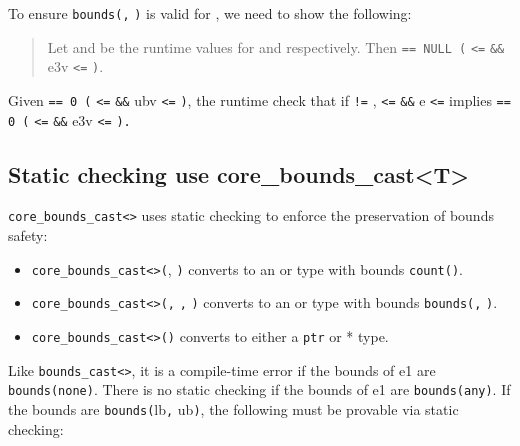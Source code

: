 To ensure \texttt{bounds(}\texttt{,} \texttt{)} is
valid for , we need to show the following:

\begin{quote}
Let  and  be the runtime values for  and
 respectively. Then  \texttt{== NULL
\textbar{}\textbar{} (} \texttt{\textless{}=} 
\texttt{\&\&} e3v \texttt{\textless{}=} \texttt{)}.
\end{quote}

Given  \texttt{== 0 \textbar{}\textbar{} (}
\texttt{\textless{}=}  \texttt{\&\&} ubv \texttt{\textless{}=}
\texttt{)}, the runtime check that if  \texttt{!=}
,  \texttt{\textless{}=}  \texttt{\&\&}
e \texttt{\textless{}=}  implies 
\texttt{== 0 \textbar{}\textbar{} (} \texttt{\textless{}=}
 \texttt{\&\&} e3v \texttt{\textless{}=}
\texttt{).}

\subsection{Static checking use core\_bounds\_cast\textless{}T\textgreater{}}
\label{static-checking-use-coreux5fboundsux5fcastt}

\texttt{core\_bounds\_cast\textless{}}\texttt{\textgreater{}}
uses static checking to enforce the preservation of bounds safety:

\begin{itemize}
\item
  \texttt{core\_bounds\_cast\textless{}}\texttt{\textgreater{}(},
  \texttt{)} converts  to an \arrayptr or
  \arrayview type with bounds
  \texttt{count(}\texttt{)}.
\item
  \texttt{core\_bounds\_cast\textless{}}\texttt{\textgreater{}(}\texttt{,}
  \texttt{,} \texttt{)} converts  to an
  \arrayptr or \arrayview type with bounds
  \texttt{bounds(}\texttt{,} \texttt{)}.
\item
  \texttt{core\_bounds\_cast\textless{}}\texttt{\textgreater{}(}\texttt{)}
  converts  to either a \texttt{ptr} or * type.
\end{itemize}

Like \texttt{bounds\_cast\textless{}}\texttt{\textgreater{}}, it
is a compile-time error if the bounds of e1 are \texttt{bounds(none)}.
There is no static checking if the bounds of e1 are
\texttt{bounds(any)}. If the bounds are \texttt{bounds(}lb\texttt{,}
ub\texttt{)}, the following must be provable via static checking:

